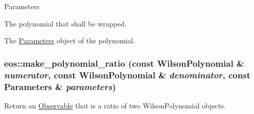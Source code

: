 \begin{DoxyParams}{Parameters}
\item[{\em polynomial}]The polynomial that shall be wrapped. \item[{\em parameters}]The \hyperlink{classeos_1_1Parameters}{Parameters} object of the polynomial. \end{DoxyParams}
\hypertarget{namespaceeos_aeb8e7723a15217742675f8f16ebbc4f9}{
\subsubsection[{make\_\-polynomial\_\-ratio}]{ eos::make\_\-polynomial\_\-ratio (const WilsonPolynomial \& {\em numerator}, \/  const WilsonPolynomial \& {\em denominator}, \/  const Parameters \& {\em parameters})}}
\label{namespaceeos_aeb8e7723a15217742675f8f16ebbc4f9}
Return an \hyperlink{classeos_1_1Observable}{Observable} that is a ratio of two WilsonPolynomial objects.



